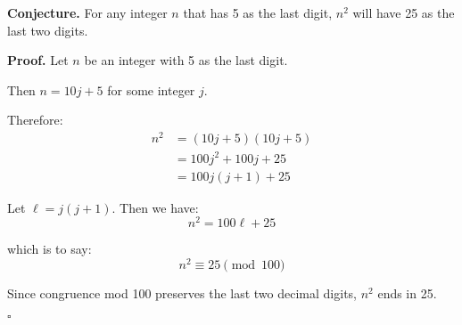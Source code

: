 \documentclass{article}
\begin{document}
\textbf{Conjecture.} For any integer \( n \) that has 5 as the last digit, \( n^2 \)
will have 25 as the last two digits.

\medskip

\textbf{Proof.} Let \( n \) be an integer with 5 as the last digit.

Then \( n = 10j + 5 \) for some integer \( j \).

Therefore:
\begin{align*}
n^2 &= (10j + 5)(10j + 5) \\
    &= 100j^2 + 100j + 25 \\
    &= 100j(j + 1) + 25
\end{align*}

Let \( \ell = j(j + 1) \). Then we have:
\[
n^2 = 100\ell + 25
\]

which is to say:
\[
n^2 \equiv 25 \pmod{100}
\]

Since congruence mod 100 preserves the last two decimal digits, \( n^2 \) ends in 25.

\hfill $\square$
\end{document}
